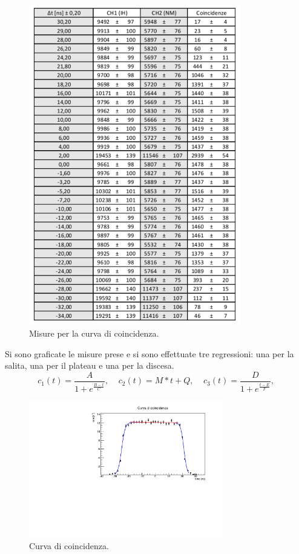 \documentclass[11pt]{article} %
\begin{document}
\begin{figure}[h!]
\begin{center}
\includegraphics[width=350px]{img/table_C.pdf}
\caption{Misure per la curva di coincidenza.}
\label{fig:table_C}
\end{center}
\end{figure}
Si sono graficate le misure prese e si sono effettuate tre regressioni: una per la salita, una per il plateau e una per la discesa.
\begin{equation}
c_1\left( t \right) =\frac{A}{1+e^{\frac{B-t}{C}}},\;\;\;\;c_2  \left( t \right) = M*t+Q,\;\;\;\;c_3 \left( t \right) =\frac{D}{1+e^{\frac{t-E}{F}}},\;
\end{equation}
\newpage
\begin{figure}[h!]
\begin{center}
\includegraphics[width=320px]{img/chart_C.pdf}
\caption{Curva di coincidenza.}
\label{fig:coin}
\end{center}
\end{figure}
\end{document}
